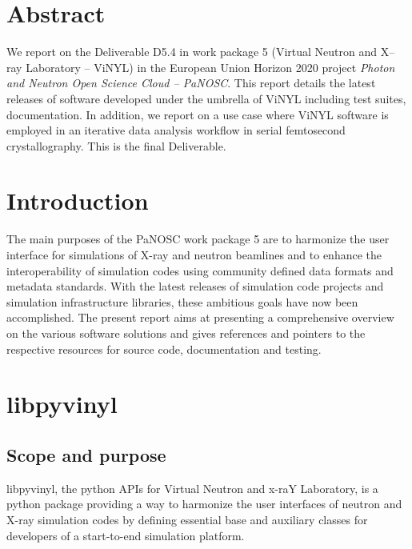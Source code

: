 \documentclass[11pt, a4paper]{article}
\begin{document}
\newpage
{}
\newpage
\tableofcontents
\newpage

\section{Abstract}
We report on the Deliverable D5.4 in work package 5 (Virtual Neutron and X--ray
Laboratory -- ViNYL) in the European Union Horizon 2020 project \emph{Photon
  and Neutron Open Science Cloud -- PaNOSC}. 
This report details the latest releases of  software developed under the umbrella of
ViNYL including test suites, documentation. In addition, we report on a use case
where ViNYL software is employed in an iterative data analysis workflow in serial
femtosecond crystallography. This is the final Deliverable.

\section{Introduction}

The main purposes of the PaNOSC work package 5 are to
harmonize the user interface for simulations of X-ray and neutron beamlines and
to enhance the interoperability of simulation codes using community
defined data formats and metadata standards. With the latest releases of
simulation code projects and simulation infrastructure libraries, these
ambitious
goals have now been accomplished. The present report aims at presenting a
comprehensive
overview on the various software solutions and gives references and pointers to
the respective resources for source code,
documentation and testing.

\section{libpyvinyl}
\label{sec:libpyvinyl}


\subsection{Scope and purpose}
\label{sec:lpv_scope}
libpyvinyl, the python APIs for Virtual Neutron and x-raY Laboratory, is a python package providing a way to harmonize the user interfaces of neutron and X-ray simulation codes by defining essential base and auxiliary classes for developers of a start-to-end simulation platform. 
\end{document}
